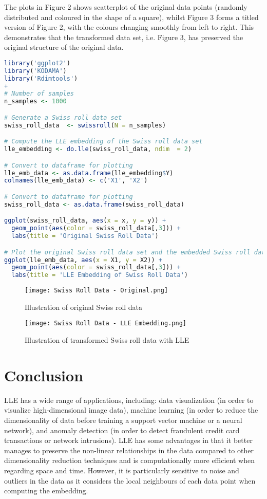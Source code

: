 The plots in Figure 2 shows scatterplot of the original data points (randomly distributed and coloured in the shape of a square), whilst Figure 3 forms a titled version of Figure 2, with the colours changing smoothly from left to right. This demonstrates that the transformed data set, i.e. Figure 3, has preserved the original structure of the original data.
\begin{lstlisting}[language=R]
library('ggplot2')
library('KODAMA')
library('Rdimtools')
+
# Number of samples
n_samples <- 1000

# Generate a Swiss roll data set
swiss_roll_data  <- swissroll(N = n_samples)

# Compute the LLE embedding of the Swiss roll data set
lle_embedding <- do.lle(swiss_roll_data, ndim  = 2)

# Convert to dataframe for plotting
lle_emb_data <- as.data.frame(lle_embedding$Y)
colnames(lle_emb_data) <- c('X1', 'X2')

# Convert to dataframe for plotting
swiss_roll_data <- as.data.frame(swiss_roll_data)

ggplot(swiss_roll_data, aes(x = x, y = y)) +
  geom_point(aes(color = swiss_roll_data[,3])) +
  labs(title = 'Original Swiss Roll Data')

# Plot the original Swiss roll data set and the embedded Swiss roll data set
ggplot(lle_emb_data, aes(x = X1, y = X2)) +
  geom_point(aes(color = swiss_roll_data[,3])) +
  labs(title = 'LLE Embedding of Swiss Roll Data')
\end{lstlisting}
\begin{figure}[h]
    \centering
    \texttt{[image: Swiss Roll Data - Original.png]}
    \caption{Illustration of original Swiss roll data}
    \label{fig:my_label}
\end{figure}

\begin{figure}[h]
    \centering
    \texttt{[image: Swiss Roll Data - LLE Embedding.png]}
    \caption{Illustration of transformed Swiss roll data with LLE}
    \label{fig:my_label}
\end{figure}

\section{Conclusion}
LLE has a wide range of applications, including: data visualization (in order to visualize high-dimensional image data), machine learning (in order to reduce the dimensionality of data before training a support vector machine or a neural network), and anomaly detection (in order to detect fraudulent credit card transactions or network intrusions).
LLE has some advantages in that it better manages to preserve the non-linear relationships in the data compared to other dimensionality reduction techniques and is computationally more efficient when regarding space and time.
However, it is particularly sensitive to noise and outliers in the data as it considers the local neighbours of each data point when computing the embedding.




